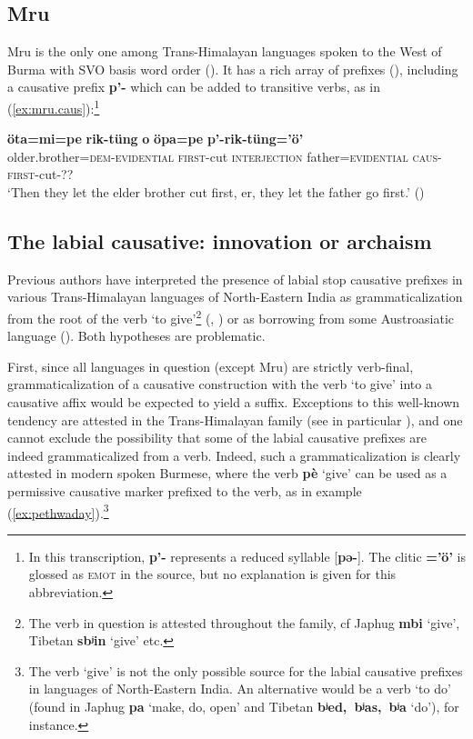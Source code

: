 \documentclass[oneside,a4paper,11pt]{article}
\newcommand{\ipa}[1]{\textbf{{\phon\mbox{#1}}}} %
\newcommand{\forme}[2]{\ipa{#1} `#2'}
\newcommand{\refb}[1]{(\ref{#1})}
\begin{document}
\subsection{Mru} \label{sec:mru}
Mru is the only one among Trans-Himalayan languages spoken to the West of Burma with SVO basis word order (\citealt{peterson05mru}). It has a rich array of prefixes (\citealt{williams08directionals}), including a causative prefix \ipa{p'-} which can be added to transitive verbs, as in \refb{ex:mru.caus}:\footnote{In this transcription, \ipa{p'-} represents a reduced syllable [\ipa{pə-}]. The clitic \ipa{=’ö’} is glossed as \textsc{emot} in the source, but no explanation is given for this abbreviation.}
 
\begin{exe}
\ex \label{ex:mru.caus}
\gll
\ipa{öta=mi=pe} \ipa{rik-tüng} \ipa{o} \ipa{öpa=pe} \ipa{p’-rik-tüng=’ö’} \\
older.brother=\textsc{dem-evidential} \textsc{first}-cut \textsc{interjection} father=\textsc{evidential} \textsc{caus-first}-cut-?? \\
\glt `Then they let the elder brother cut first, er, they let the father go first.' (\citealt[52]{williams08directionals})
\end{exe}
 
\subsection{The labial causative: innovation or archaism} \label{sec:innovation}
Previous authors have interpreted the presence of labial stop causative prefixes in various Trans-Himalayan languages of North-Eastern India as  grammaticalization from the root of the verb `to give'\footnote{The verb in question is attested throughout the family, cf Japhug \forme{mbi}{give}, Tibetan \forme{sbʲin}{give} etc.}
(\citealt[132]{matisoff03}, \citealt{jenny15give}) or as borrowing from some Austroasiatic language (\citealt{maspero46, diffloth08parallels, konnerth15cisloc, delancey15adjectival}). Both hypotheses are problematic. 

First, since all languages in question (except Mru) are strictly verb-final, grammaticalization of a causative construction with the verb `to give' into a causative affix would be expected to yield a suffix. Exceptions to this well-known tendency are attested in the Trans-Himalayan family (see in particular \citealt{jacques13harmonization}), and one cannot exclude the possibility that some of the labial causative prefixes are indeed grammaticalized from a verb. Indeed, such a grammaticalization is clearly attested in modern spoken Burmese, where the verb \ipa{pè} `give' can be used as a permissive causative marker prefixed to the verb, as in example (\ref{ex:pethwaday}).\footnote{The verb `give' is not the only possible source for the labial causative prefixes in languages of North-Eastern India. An alternative would be a verb `to do' (found in Japhug \forme{pa}{make, do, open} and Tibetan \forme{bʲed, bʲas, bʲa}{do}), for instance. }
\end{document}
